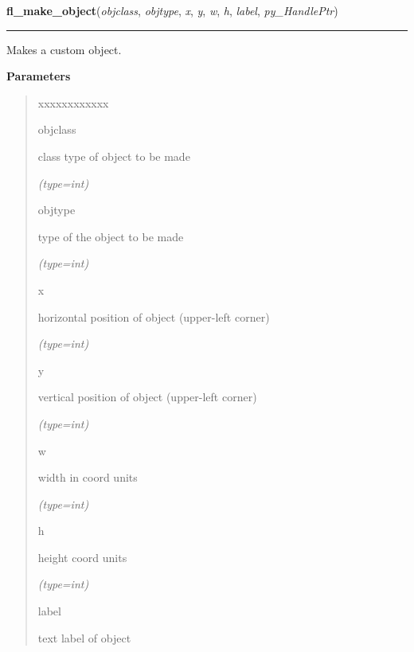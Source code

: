 \hspace{.8\funcindent}\begin{boxedminipage}{\funcwidth}

    \raggedright \textbf{fl\_make\_object}(\textit{objclass}, \textit{objtype}, \textit{x}, \textit{y}, \textit{w}, \textit{h}, \textit{label}, \textit{py\_HandlePtr})

    \vspace{-1.5ex}

    \rule{\textwidth}{0.5\fboxrule}
\setlength{\parskip}{2ex}
    Makes a custom object.

\setlength{\parskip}{1ex}
      \textbf{Parameters}
      \vspace{-1ex}

      \begin{quote}
        \begin{Ventry}{xxxxxxxxxxxx}

          \item[objclass]

          class type of object to be made

            {\it (type=int)}

          \item[objtype]

          type of the object to be made

            {\it (type=int)}

          \item[x]

          horizontal position of object (upper-left corner)

            {\it (type=int)}

          \item[y]

          vertical position of object (upper-left corner)

            {\it (type=int)}

          \item[w]

          width in coord units

            {\it (type=int)}

          \item[h]

          height coord units

            {\it (type=int)}

          \item[label]

          text label of object


\end{Ventry}
\end{quote}
\end{boxedminipage}
